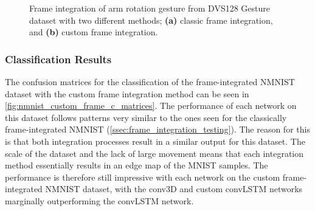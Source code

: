 \begin{figure}[htb]%
    \centering
    \qquad
    \caption{Frame integration of arm rotation gesture from DVS128 Gesture dataset with two different methods; \textbf{(a)} classic frame integration, and \textbf{(b)} custom frame integration.}%
    \label{fig:frame_integration_comparison}%
\end{figure}

\subsubsection{Classification Results}

The confusion matrices for the classification of the frame-integrated NMNIST dataset with the custom frame integration method can be seen in \cref{fig:nmnist_custom_frame_c_matrices}. The performance of each network on this dataset follows patterns very similar to the ones seen for the classically frame-integrated NMNIST (\cref{ssec:frame_integration_testing}). The reason for this is that both integration processes result in a similar output for this dataset. The scale of the dataset and the lack of large movement means that each integration method essentially results in an edge map of the MNIST samples. The performance is therefore still impressive with each network on the custom frame-integrated NMNIST dataset, with the conv3D and custom convLSTM networks marginally outperforming the convLSTM network.

